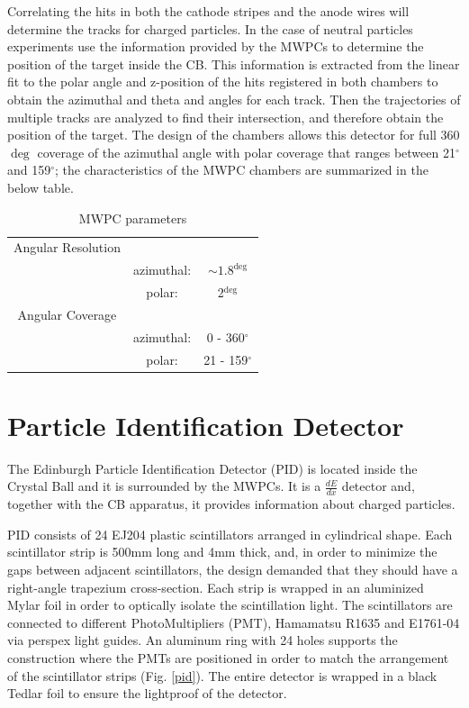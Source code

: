 \indent Correlating  the  hits  in  both  the cathode  stripes  and  the  anode  wires  will determine the tracks for charged particles. In the case of neutral particles experiments use the information provided by the MWPCs to determine the position of the target inside the CB. This information is extracted from the linear fit to the polar angle and z-position of the hits registered in both chambers to obtain the azimuthal and theta and angles for each track. Then the trajectories of multiple tracks are analyzed to find their intersection, and therefore obtain the position of the target. The design of the chambers allows this detector for full 360$\deg$ coverage of the azimuthal angle with polar coverage that ranges between 21$^{\circ}$ and 159$^{\circ}$; the characteristics of the MWPC chambers are summarized in the below table.

\newcommand{\rs}[1]{\renewcommand{\arraystretch}{#1}}
\begin{table}[ht]
\rs{1.5}
\caption{MWPC parameters}
\centering
\begin{tabular}{c c c}
\hline\hline
Angular Resolution & & \\
 & azimuthal: & $\sim 1.8^{\deg}$ \\
 & polar: & 2$^{\deg}$ \\
\hline
Angular Coverage & & \\
 & azimuthal: & 0 - 360$^{\circ}$ \\
 & polar: & 21 - 159$^{\circ}$ \\
\hline\hline
\end{tabular}
\label{table_mwpc}
\end{table} 

\section{Particle Identification Detector}

\indent The Edinburgh Particle Identification Detector (PID) is located inside the Crystal Ball and it is surrounded by the MWPCs. It is a $\frac{dE}{dx}$ detector and, together with the CB apparatus, it provides information about charged particles.

\indent PID consists of 24 EJ204 plastic scintillators arranged in cylindrical shape. Each scintillator strip is 500mm long and 4mm thick, and, in order to minimize the gaps between adjacent scintillators, the design demanded that they should have a right-angle trapezium cross-section. Each strip is wrapped in an aluminized Mylar foil in order to  optically  isolate  the scintillation  light.  The  scintillators  are  connected  to different PhotoMultipliers (PMT), Hamamatsu R1635 and E1761-04 via perspex light guides. An aluminum ring with 24 holes supports the construction  where the PMTs are positioned in order to match the arrangement of  the  scintillator  strips (Fig. \ref{pid}).  The  entire detector is wrapped in a black Tedlar foil to ensure the lightproof of the detector.

